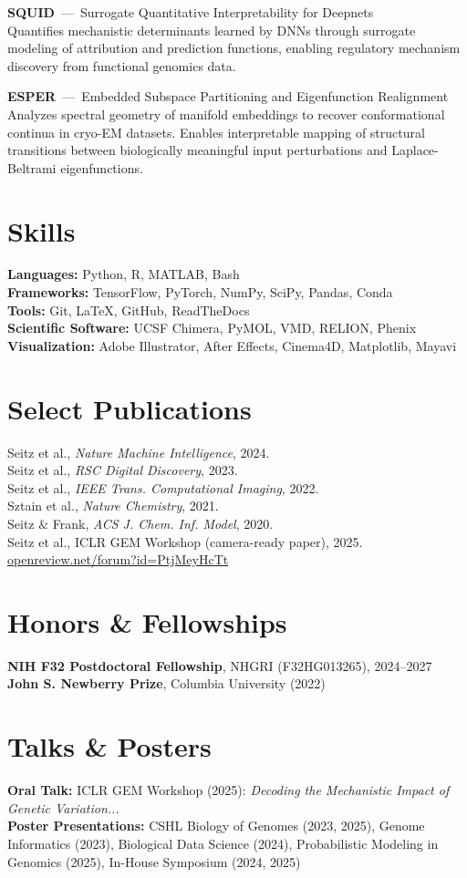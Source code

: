 \documentclass[11pt]{article}
\begin{document}
\textbf{SQUID} \,---\, Surrogate Quantitative Interpretability for Deepnets\\
Quantifies mechanistic determinants learned by DNNs through surrogate modeling of attribution and prediction functions, enabling regulatory mechanism discovery from functional genomics data.


\textbf{ESPER} \,---\, Embedded Subspace Partitioning and Eigenfunction Realignment\\
Analyzes spectral geometry of manifold embeddings to recover conformational continua in cryo-EM datasets. Enables interpretable mapping of structural transitions between biologically meaningful input perturbations and Laplace-Beltrami eigenfunctions.

\section*{Skills}
\textbf{Languages:} Python, R, MATLAB, Bash\\
\textbf{Frameworks:} TensorFlow, PyTorch, NumPy, SciPy, Pandas, Conda\\
\textbf{Tools:} Git, LaTeX, GitHub, ReadTheDocs\\
\textbf{Scientific Software:} UCSF Chimera, PyMOL, VMD, RELION, Phenix\\
\textbf{Visualization:} Adobe Illustrator, After Effects, Cinema4D, Matplotlib, Mayavi

\section*{Select Publications}
Seitz et al., \textit{Nature Machine Intelligence}, 2024.\\
Seitz et al., \textit{RSC Digital Discovery}, 2023.\\
Seitz et al., \textit{IEEE Trans. Computational Imaging}, 2022.\\
Sztain et al., \textit{Nature Chemistry}, 2021.\\
Seitz \& Frank, \textit{ACS J. Chem. Inf. Model}, 2020.\\
Seitz et al., ICLR GEM Workshop (camera-ready paper), 2025. \href{https://openreview.net/forum?id=PtjMeyHcTt}{openreview.net/forum?id=PtjMeyHcTt}

\section*{Honors \& Fellowships}
\textbf{NIH F32 Postdoctoral Fellowship}, NHGRI (F32HG013265), 2024--2027\\
\textbf{John S. Newberry Prize}, Columbia University (2022)

\section*{Talks \& Posters}
\textbf{Oral Talk:} ICLR GEM Workshop (2025): \textit{Decoding the Mechanistic Impact of Genetic Variation...}\\
\textbf{Poster Presentations:} CSHL Biology of Genomes (2023, 2025), Genome Informatics (2023), Biological Data Science (2024), Probabilistic Modeling in Genomics (2025), In-House Symposium (2024, 2025)
\end{document}
